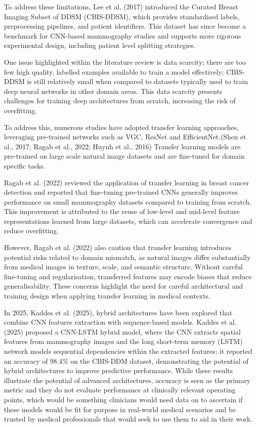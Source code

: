 To address these limitations, Lee et al. (2017) introduced the Curated Breast Imaging Subset of DDSM (CBIS-DDSM), which provides standardised labels, preprocessing pipelines, and patient identifiers. This dataset has since become a benchmark for CNN-based mammography studies and supports more rigorous experimental design, including patient level splitting strategies.

One issue highlighted within the literature review is data scarcity; there are too few high quality, labelled examples available to train a model effectively; CBIS-DDSM is still relatively small when compared to datasets typically used to train deep neural networks in other domain areas. This data scarcity presents challenges for training deep architectures from scratch, increasing the risk of overfitting.

To address this, numerous studies have adopted transfer learning approaches, leveraging pre-trained networks such as VGC, ResNet and EfficientNet.(Shen et al., 2017; Ragab et al., 2022; Huynh et al., 2016) Transfer learning models are pre-trained on large scale natural image datasets and are fine-tuned for domain specific tasks.

Ragab et al. (2022) reviewed the application of transfer learning in breast cancer detection and reported that fine-tuning pre-trained CNNs generally improves performance on small mammography datasets compared to training from scratch. This improvement is attributed to the reuse of low-level and mid-level feature representations learned from large datasets, which can accelerate convergence and reduce overfitting.

However, Ragab et al. (2022) also caution that transfer learning introduces potential risks related to domain mismatch, as natural images differ substantially from medical images in texture, scale, and semantic structure. Without careful fine-tuning and regularisation, transferred features may encode biases that reduce generalisability. These concerns highlight the need for careful architectural and training design when applying transfer learning in medical contexts.

In 2025, Kaddes et al. (2025), hybrid architectures have been explored that combine CNN features extraction with sequence-based models. Kaddes et al. (2025) proposed a CNN-LSTM hybrid model, where the CNN extracts spatial features from mammography images and the long short-term memory (LSTM) network models sequential dependencies within the extracted features; it reported an accuracy of 98.4\% on the CBIS-DDM dataset, demonstrating the potential of hybrid architectures to improve predictive performance. While these results illustrate the potential of advanced architectures, accuracy is seen as the primary metric and they do not evaluate performance at clinically relevant operating points, which would be something clinicians would need data on to ascertain if these models would be fit for purpose in real-world medical scenarios and be trusted by medical professionals that would seek to use them to aid in their work.

